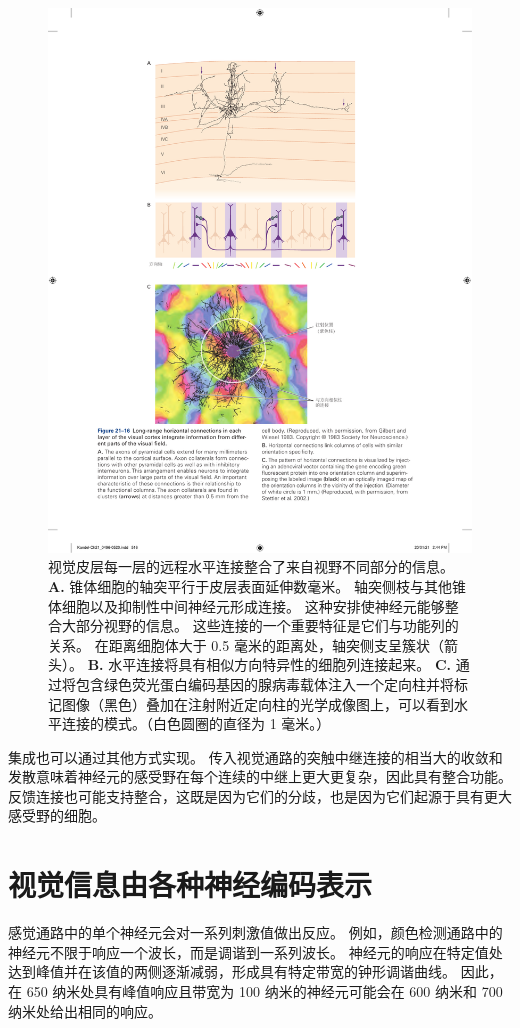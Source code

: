 \begin{figure}[htbp]
	\centering
	\includegraphics[width=0.75\linewidth]{chap21/fig_21_16}
	\caption{视觉皮层每一层的远程水平连接整合了来自视野不同部分的信息。
		\textbf{A.} 锥体细胞的轴突平行于皮层表面延伸数毫米。 
		轴突侧枝与其他锥体细胞以及抑制性中间神经元形成连接。
		这种安排使神经元能够整合大部分视野的信息。
		这些连接的一个重要特征是它们与功能列的关系。
		在距离细胞体大于 0.5 毫米的距离处，轴突侧支呈簇状（箭头）。
		\textbf{B.} 水平连接将具有相似方向特异性的细胞列连接起来。
		\textbf{C.} 通过将包含绿色荧光蛋白编码基因的腺病毒载体注入一个定向柱并将标记图像（黑色）叠加在注射附近定向柱的光学成像图上，可以看到水平连接的模式。（白色圆圈的直径为 1 毫米。）}
	\label{fig:21_16}
\end{figure}


集成也可以通过其他方式实现。
传入视觉通路的突触中继连接的相当大的收敛和发散意味着神经元的感受野在每个连续的中继上更大更复杂，因此具有整合功能。 
反馈连接也可能支持整合，这既是因为它们的分歧，也是因为它们起源于具有更大感受野的细胞。



\section{视觉信息由各种神经编码表示}

感觉通路中的单个神经元会对一系列刺激值做出反应。
例如，颜色检测通路中的神经元不限于响应一个波长，而是调谐到一系列波长。 
神经元的响应在特定值处达到峰值并在该值的两侧逐渐减弱，形成具有特定带宽的钟形调谐曲线。
因此，在 650 纳米处具有峰值响应且带宽为 100 纳米的神经元可能会在 600 纳米和 700 纳米处给出相同的响应。


